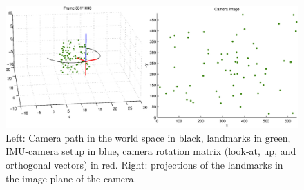 \begin{figure}[t]
\centering
\includegraphics[width=\linewidth]{synth_path.eps}
\caption{Left: Camera path in the world space in black, landmarks in green, IMU-camera setup in blue, camera rotation matrix (look-at, up, and orthogonal vectors) in red. Right: projections of the landmarks in the image plane of the camera.}
\label{synthpath}
\end{figure}